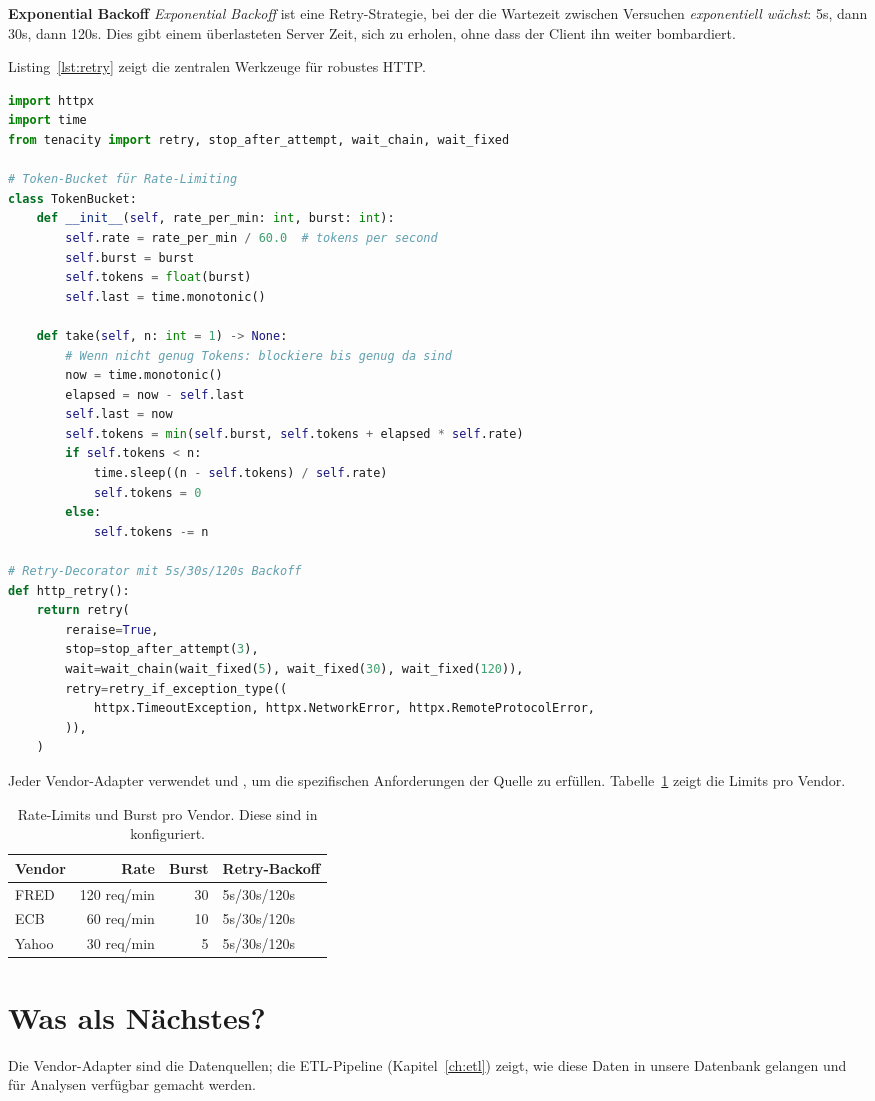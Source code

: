 \begin{definition}
\textbf{Exponential Backoff}
\emph{Exponential Backoff} ist eine Retry-Strategie, bei der die
Wartezeit zwischen Versuchen \emph{exponentiell wächst}: 5s, dann
30s, dann 120s. Dies gibt einem überlasteten Server Zeit, sich zu
erholen, ohne dass der Client ihn weiter bombardiert.
\end{definition}

Listing~\ref{lst:retry} zeigt die zentralen Werkzeuge für robustes
HTTP.

\begin{lstlisting}[language=python, caption={Rate-Limiting und Retry-Logik},label=lst:retry]
import httpx
import time
from tenacity import retry, stop_after_attempt, wait_chain, wait_fixed

# Token-Bucket für Rate-Limiting
class TokenBucket:
    def __init__(self, rate_per_min: int, burst: int):
        self.rate = rate_per_min / 60.0  # tokens per second
        self.burst = burst
        self.tokens = float(burst)
        self.last = time.monotonic()

    def take(self, n: int = 1) -> None:
        # Wenn nicht genug Tokens: blockiere bis genug da sind
        now = time.monotonic()
        elapsed = now - self.last
        self.last = now
        self.tokens = min(self.burst, self.tokens + elapsed * self.rate)
        if self.tokens < n:
            time.sleep((n - self.tokens) / self.rate)
            self.tokens = 0
        else:
            self.tokens -= n

# Retry-Decorator mit 5s/30s/120s Backoff
def http_retry():
    return retry(
        reraise=True,
        stop=stop_after_attempt(3),
        wait=wait_chain(wait_fixed(5), wait_fixed(30), wait_fixed(120)),
        retry=retry_if_exception_type((
            httpx.TimeoutException, httpx.NetworkError, httpx.RemoteProtocolError,
        )),
    )
\end{lstlisting}

Jeder Vendor-Adapter verwendet  und
, um die spezifischen Anforderungen der Quelle
zu erfüllen. Tabelle~\ref{tab:rate-limits} zeigt die Limits pro
Vendor.

\begin{table}[ht]
\centering
\small
\begin{tabular}{lrrl}
  \toprule
  \textbf{Vendor} & \textbf{Rate} & \textbf{Burst} & \textbf{Retry-Backoff} \\
  \midrule
  FRED   & 120 req/min & 30 & 5s/30s/120s \\
  ECB    & 60 req/min  & 10 & 5s/30s/120s \\
  Yahoo  & 30 req/min  & 5  & 5s/30s/120s \\
  \bottomrule
\end{tabular}
\caption{Rate-Limits und Burst pro Vendor. Diese sind in
   konfiguriert.}
\label{tab:rate-limits}
\end{table}

\section{Was als Nächstes?}

Die Vendor-Adapter sind die Datenquellen; die ETL-Pipeline
(Kapitel~\ref{ch:etl}) zeigt, wie diese Daten in unsere
Datenbank gelangen und für Analysen verfügbar gemacht werden.
